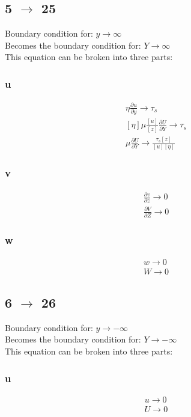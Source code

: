 \documentclass[10pt, letterpaper, twoside]{article}
\newcommand{\pd}[2]{\frac{\partial#1}{\partial#2}}
\begin{document}
	\subsection{5 $ \rightarrow $ 25}
	Boundary condition for: $ y\rightarrow\infty $\\
	Becomes the boundary condition for: $ Y\rightarrow\infty$\\
	This equation can be broken into three parts:
	\subsubsection{u}
	\begin{gather*}
		\eta\pd{u}{y}\rightarrow\tau_s \tag{5a} \\
		\left[\eta\right]\mu\frac{\left[u\right]}{\left[z\right]}\pd{U}{Y}\rightarrow\tau_s\\
		\mu\pd{U}{Y}\rightarrow\frac{\tau_s\left[z\right]}{\left[u\right]\left[\eta\right]} \tag{5a$ ' $}
	\end{gather*}
	\subsubsection{v}
	\begin{gather*}
		\pd{v}{z} \rightarrow 0 \tag{5b} \\
		\pd{V}{Z} \rightarrow 0 \tag{25b}
	\end{gather*}
	\subsubsection{w}
	\begin{gather*}
		w \rightarrow 0 \tag{5c} \\
		W \rightarrow 0 \tag{25c}
	\end{gather*}
	\subsection{6 $ \rightarrow $ 26}
	Boundary condition for: $ y\rightarrow-\infty $\\
	Becomes the boundary condition for: $ Y\rightarrow-\infty$\\
	This equation can be broken into three parts:
	\subsubsection{u}
	\begin{gather*}
		u \rightarrow 0 \tag{6a} \\
		U \rightarrow 0 \tag{26a}
	\end{gather*}
\end{document}

